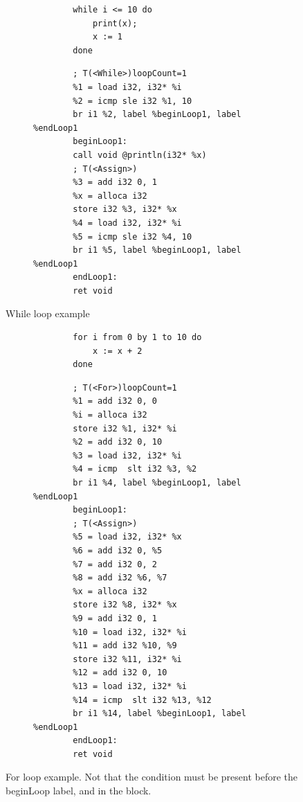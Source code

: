 \documentclass[letterpaper]{article}
\begin{document}
\begin{figure}[H]
    \begin{subfigure}{.5\textwidth}
        \begin{lstlisting}
        while i <= 10 do
            print(x);
            x := 1
        done
        \end{lstlisting}
    \end{subfigure}
    \begin{subfigure}{.5\textwidth}
        \begin{lstlisting}
        ; T(<While>)loopCount=1
    	%1 = load i32, i32* %i
    	%2 = icmp sle i32 %1, 10
    	br i1 %2, label %beginLoop1, label %endLoop1
    	beginLoop1:
    	call void @println(i32* %x)
    	; T(<Assign>)
    	%3 = add i32 0, 1
    	%x = alloca i32
    	store i32 %3, i32* %x
    	%4 = load i32, i32* %i
    	%5 = icmp sle i32 %4, 10
    	br i1 %5, label %beginLoop1, label %endLoop1
    	endLoop1:
    	ret void
        \end{lstlisting}
    \end{subfigure}
     \caption{While loop example}
\end{figure}


\begin{figure}[H]
    \begin{subfigure}{.5\textwidth}
        \begin{lstlisting}
        for i from 0 by 1 to 10 do
            x := x + 2
        done
        \end{lstlisting}
    \end{subfigure}
    \begin{subfigure}{.5\textwidth}
        \begin{lstlisting}
        ; T(<For>)loopCount=1
    	%1 = add i32 0, 0
    	%i = alloca i32
    	store i32 %1, i32* %i
    	%2 = add i32 0, 10
    	%3 = load i32, i32* %i
    	%4 = icmp  slt i32 %3, %2
    	br i1 %4, label %beginLoop1, label %endLoop1
    	beginLoop1:
    	; T(<Assign>)
    	%5 = load i32, i32* %x
    	%6 = add i32 0, %5
    	%7 = add i32 0, 2
    	%8 = add i32 %6, %7
    	%x = alloca i32
    	store i32 %8, i32* %x
    	%9 = add i32 0, 1
    	%10 = load i32, i32* %i
    	%11 = add i32 %10, %9
    	store i32 %11, i32* %i
    	%12 = add i32 0, 10
    	%13 = load i32, i32* %i
    	%14 = icmp  slt i32 %13, %12
    	br i1 %14, label %beginLoop1, label %endLoop1
    	endLoop1:
    	ret void
        \end{lstlisting}
    \end{subfigure}
    \caption{For loop example. Not that the condition must be present
    before the beginLoop label, and in the block.}
\end{figure}
\end{document}
